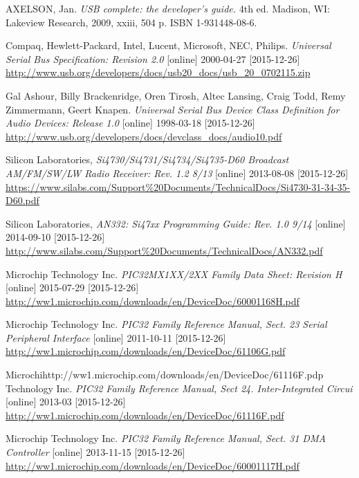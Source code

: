 \documentclass[bc,male,c,dept460]{diploma}						%
\begin{document}
\begin{thebibliography}{99}

 AXELSON, Jan. 
\textit{USB complete: the developer's guide.} 4th ed. Madison, WI: Lakeview Research, 2009, xxiii, 504 p. ISBN 1-931448-08-6.

 Compaq, Hewlett-Packard, Intel, Lucent, Microsoft, NEC, Philips. 
\textit{Universal Serial Bus Specification: Revision 2.0} [online] 2000-04-27 [2015-12-26]
\url{http://www.usb.org/developers/docs/usb20_docs/usb_20_0702115.zip}

 Gal Ashour, Billy Brackenridge, Oren Tirosh, Altec Lansing, Craig Todd, Remy Zimmermann, Geert Knapen. 
\textit{Universal Serial Bus Device Class Definition for Audio Devices: Release 1.0} [online] 1998-03-18 [2015-12-26]
\url{http://www.usb.org/developers/docs/devclass_docs/audio10.pdf}


 Silicon Laboratories,
\textit{Si4730/Si4731/Si4734/Si4735-D60 Broadcast AM/FM/SW/LW Radio Receiver: Rev. 1.2 8/13} [online] 2013-08-08 [2015-12-26] \url{https://www.silabs.com/Support\%20Documents/TechnicalDocs/Si4730-31-34-35-D60.pdf}

 Silicon Laboratories,
\textit{AN332: Si47xx Programming Guide: Rev. 1.0 9/14 } [online] 2014-09-10 [2015-12-26] \url{http://www.silabs.com/Support\%20Documents/TechnicalDocs/AN332.pdf}

 Microchip Technology Inc.
\textit{PIC32MX1XX/2XX Family Data Sheet: Revision H} [online] 2015-07-29 [2015-12-26]
\url{http://ww1.microchip.com/downloads/en/DeviceDoc/60001168H.pdf}

 Microchip Technology Inc.
\textit{PIC32 Family Reference Manual, Sect. 23 Serial Peripheral Interface} [online] 2011-10-11 [2015-12-26]
\url{http://ww1.microchip.com/downloads/en/DeviceDoc/61106G.pdf}

 Microchihttp://ww1.microchip.com/downloads/en/DeviceDoc/61116F.pdp Technology Inc.
\textit{PIC32 Family Reference Manual,  Sect 24. Inter-Integrated Circui} [online] 2013-03 [2015-12-26]
\url{http://ww1.microchip.com/downloads/en/DeviceDoc/61116F.pdf}

 Microchip Technology Inc.
\textit{PIC32 Family Reference Manual, Sect. 31 DMA Controller} [online] 2013-11-15 [2015-12-26]
\url{http://ww1.microchip.com/downloads/en/DeviceDoc/60001117H.pdf}


\end{thebibliography}
\end{document}
